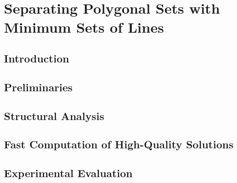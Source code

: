 \chapter{Separating Polygonal Sets with Minimum Sets of Lines}
\thispagestyle{myheadings}

\section{Introduction}
\label{sec:bf-intro}

\section{Preliminaries}\label{sec:bf-preliminary}


\section{Structural Analysis}\label{sec:bf-structure}


\section{Fast Computation of High-Quality Solutions}\label{sec:bf-algorithm}


\section{Experimental Evaluation}\label{sec:bf-evaluation}

